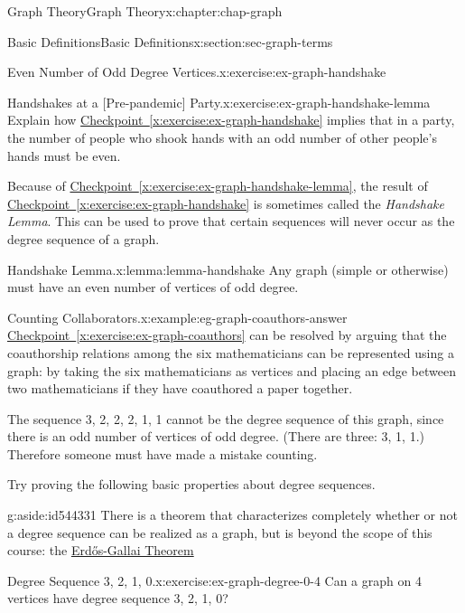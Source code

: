 \documentclass[oneside,10pt,]{book}
\newcommand{\xreffont}{\relax}
\numberwithin{equation}{section}
\begin{document}
\begin{chapterptx}{Graph Theory}{}{Graph Theory}{}{}{x:chapter:chap-graph}
\begin{sectionptx}{Basic Definitions}{}{Basic Definitions}{}{}{x:section:sec-graph-terms}
\begin{inlineexercise}{Even Number of Odd Degree Vertices.}{x:exercise:ex-graph-handshake}
\end{inlineexercise}%
\begin{inlineexercise}{Handshakes at a [Pre-pandemic] Party.}{x:exercise:ex-graph-handshake-lemma}%
Explain how \hyperref[x:exercise:ex-graph-handshake]{Checkpoint~{\xreffont\ref{x:exercise:ex-graph-handshake}}} implies that in a party, the number of people who shook hands with an odd number of other people's hands must be even.%
\end{inlineexercise}%
Because of \hyperref[x:exercise:ex-graph-handshake-lemma]{Checkpoint~{\xreffont\ref{x:exercise:ex-graph-handshake-lemma}}}, the result of \hyperref[x:exercise:ex-graph-handshake]{Checkpoint~{\xreffont\ref{x:exercise:ex-graph-handshake}}} is sometimes called the \emph{Handshake Lemma}. This can be used to prove that certain sequences will never occur as the degree sequence of a graph.%
\begin{lemma}{Handshake Lemma.}{}{x:lemma:lemma-handshake}%
Any graph (simple or otherwise) must have an even number of vertices of odd degree.%
\end{lemma}
\begin{example}{Counting Collaborators.}{x:example:eg-graph-coauthors-answer}%
\hyperref[x:exercise:ex-graph-coauthors]{Checkpoint~{\xreffont\ref{x:exercise:ex-graph-coauthors}}} can be resolved by arguing that the coauthorship relations among the six mathematicians can be represented using a graph: by taking the six mathematicians as vertices and placing an edge between two mathematicians if they have coauthored a paper together.%
\par
The sequence 3, 2, 2, 2, 1, 1 cannot be the degree sequence of this graph, since there is an odd number of vertices of odd degree. (There are three: 3, 1, 1.) Therefore someone must have made a mistake counting.%
\end{example}
Try proving the following basic properties about degree sequences.%
\begin{aside}{}{g:aside:id544331}%
There is a theorem that characterizes completely whether or not a degree sequence can be realized as a graph, but is beyond the scope of this course: the \href{https://en.wikipedia.org/wiki/Erd\%C5\%91s\%E2\%80\%93Gallai_theorem}{Erdős-Gallai Theorem}%
\end{aside}
\begin{inlineexercise}{Degree Sequence 3, 2, 1, 0.}{x:exercise:ex-graph-degree-0-4}%
Can a graph on 4 vertices have degree sequence 3, 2, 1, 0?%
\end{inlineexercise}%

\end{sectionptx}
\end{chapterptx}
\end{document}
